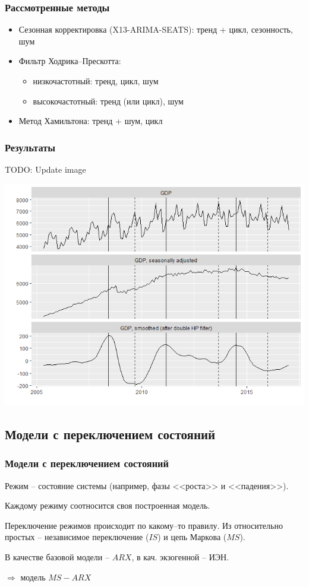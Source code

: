 \documentclass{beamer}
\begin{document}
		\begin{frame}
			\frametitle{Рассмотренные методы}
						
			\begin{itemize}
				\item Сезонная корректировка (X13-ARIMA-SEATS): тренд + цикл, сезонность, шум
				
				\item Фильтр Ходрика--Прескотта: 
					\begin{itemize}
						\item низкочастотный: тренд, цикл, шум
						\item высокочастотный: тренд (или цикл), шум
					\end{itemize}
				
				\item Метод Хамильтона: тренд + шум, цикл
			\end{itemize}
			
		\end{frame}
		
		\begin{frame}
			\frametitle{Результаты}
			
			TODO: Update image
			
			\includegraphics[height=0.7\textheight]{gdp_base-sa-hp}
		\end{frame}
		
		\subsection{Модели с переключением состояний}
		\begin{frame}
			\frametitle{Модели с переключением состояний}
			
			Режим -- состояние системы (например, фазы <<роста>> и <<падения>>).
			
			Каждому режиму соотносится своя построенная модель.
			
			Переключение режимов происходит по какому--то правилу. Из относительно простых -- независимое переключение ($IS$) и цепь Маркова ($MS$).
			
			В качестве базовой модели -- $ARX$, в кач. экзогенной -- ИЭН.
			
			$ \Rightarrow $ модель $ MS-ARX $
			
		\end{frame}
	
\end{document}
